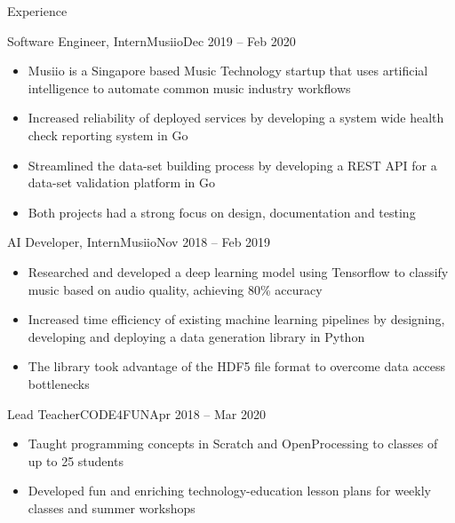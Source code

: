 \documentclass[]{mcdowellcv}
\begin{document}
	\begin{cvsection}{Experience}
		\begin{cvsubsection}{Software Engineer, Intern}{Musiio}{Dec 2019 -- Feb 2020}
			\begin{itemize}
				\item Musiio is a Singapore based Music Technology startup that uses artificial intelligence to automate common music industry workflows
				\item Increased reliability of deployed services by developing a system wide health check reporting system in Go
				\item Streamlined the data-set building process by developing a REST API for a data-set validation platform in Go
				\item Both projects had a strong focus on design, documentation and testing
			\end{itemize}
		\end{cvsubsection}
		
		\begin{cvsubsection}{AI Developer, Intern}{Musiio}{Nov 2018 -- Feb 2019}
			\begin{itemize}
				\item Researched and developed a deep learning model using Tensorflow to classify music based on audio quality, achieving 80\% accuracy
				\item Increased time efficiency of existing machine learning pipelines by designing, developing and deploying a data generation library in Python
				\item The library took advantage of the HDF5 file format to overcome data access bottlenecks
			\end{itemize}
		\end{cvsubsection}
		
		\begin{cvsubsection}{Lead Teacher}{CODE4FUN}{Apr 2018 -- Mar 2020}
			\begin{itemize}
				\item Taught programming concepts in Scratch and OpenProcessing to classes of up to 25 students
				\item Developed fun and enriching technology-education lesson plans for weekly classes and summer workshops
			\end{itemize}
		\end{cvsubsection}
	\end{cvsection}
	
\end{document}
